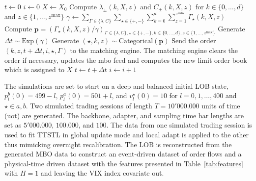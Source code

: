 \documentclass[10pt,a4paper,oneside]{article}
\begin{document}
\begin{algorithm}[H]
    \caption{Limit Order Book Simulation Algorithm}
    \label{algo:lob_simulation}
    \begin{algorithmic}
        \State $t \gets 0$
        \State $i \gets 0$
        \State $X \gets X_0$
        \State Compute $\lambda_{\pm}(k, X, z)$ and $C_{\pm}(k, X, z)$ for $k \in \{0 , \dots, d \}$ and $z \in \{ 1, \dots, z^{\max} \}$
        \State $\gamma \gets \sum_{\Gamma \in \{ \lambda, C \}} \sum_{\star \in \{+, - \}} \sum^{d}_{k = 0} \sum^{z^{\max}}_{z = 1} \Gamma_{\star}(k, X, z)$
        \State Compute $\mathbf{p} = \left(\Gamma_{\star}(k, X, z) / \gamma\right)_{\Gamma \in \{ \lambda, C \}, \star \in \{+, -\}, k \in \{ 0, \dots, d \}, z \in \{1, \dots, z^{\max} \} }$
        \State Generate $\Delta t \sim \text{Exp}(\gamma)$
        \State Generate $(\star, k, z) \sim \text{Categorical}(\mathbf{p})$
        \State Send the order $(k, z, t + \Delta t, i, \star, \Gamma)$ to the matching engine.
        \State The matching engine clears the order if necessary, updates the mbo feed and computes the new limit order book which is assigned to $X$
        \State $t \gets t + \Delta t$
        \State $i \gets i + 1$
        \EndWhile
    \end{algorithmic}
\end{algorithm}

The simulations are set to start on a deep and balanced initial LOB state, $p^b_l(0) = 499 - l$, $p^a_l(0) = 501 + l$, and $v^\star_l(0) = 10$ for $l = 0, 1, \dots, 400$ and $\star \in {a, b}$. Two simulated trading sessions of length $T = 10'000.000$ units of time (uot) are generated. The backbone, adapter, and sampling time bar lengths are set as $5'000.000$, $100.000$, and $100$. The data from one simulated trading session is used to fit TTSTL in global update mode and local adapt is applied to the other thus mimicking overnight recalibration. The LOB is reconstructed from the generated MBO data to construct an event-driven dataset of order flows and a physical-time driven dataset with the features presented in Table~\ref{tab:features} with $H = 1$ and leaving the VIX index covariate out.
\end{document}
